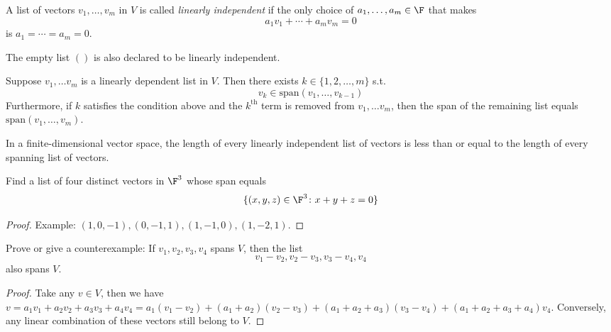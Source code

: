 \documentclass{extarticle}
\begin{document}
\begin{definition}
    A list of vectors \(v_1, \ldots, v_m\) in \(V\) is called \emph{linearly independent}
    if the only choice of \(a_1, \ldots, a_m \in \F\) that makes 
    \[a_1v_1 + \cdots + a_m v_m = 0\]
    is \(a_1 = \cdots = a_m = 0\). 

    The empty list \(()\) is also declared to be linearly independent.
\end{definition}

\begin{lemma}
    Suppose \(v_1, \ldots v_m\) is a linearly dependent list in \(V\). Then 
    there exists \(k \in \{1, 2, \ldots, m\}\) s.t. 
    \[v_k \in \text{span}(v_1, \ldots, v_{k-1})\]
    Furthermore, if \(k\) satisfies the condition above and the \(k^{\text{th}}\)
    term is removed from \(v_1, \ldots v_m\), then the span of the remaining list 
    equals \(\text{span}(v_1, \ldots, v_m)\).
\end{lemma}

\begin{lemma}
    In a finite-dimensional vector space, the length of every linearly independent 
    list of vectors is less than or equal to the length of every spanning 
    list of vectors. 
\end{lemma}

\newpage 
{}
\begin{problem}{1}
    Find a list of four distinct vectors in \(\F^3\) whose span equals 
    \[\{(x, y, z) \in \F^3 \colon x + y + z =0\}\]
\end{problem}

\begin{proof}
Example: \((1,0,-1), (0,-1,1), (1,-1,0), (1,-2,1)\). 
\end{proof}

\begin{problem}{2}
    Prove or give a counterexample: If \(v_1, v_2, v_3, v_4\) spans \(V\), then 
    the list 
    \[v_1 - v_2, v_2 - v_3, v_3 - v_4, v_4\]
    also spans \(V\).
\end{problem}

\begin{proof}
Take any \(v \in V\), then we have \(v = a_1 v_1 + a_2 v_2 + a_3 v_3 
+ a_4 v_4 = a_1(v_1 - v_2) + (a_1 + a_2) (v_2 - v_3) + (a_1 + a_2 + a_3)(
    v_3 - v_4) + (a_1 + a_2 +a_3 + a_4) v_4\). Conversely, any linear combination 
    of these vectors still belong to \(V\).
\end{proof}
\end{document}
